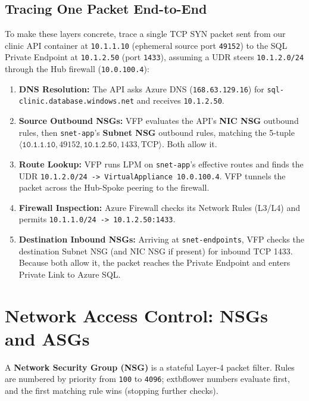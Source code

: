 \subsection{Tracing One Packet End-to-End}
To make these layers concrete, trace a single TCP SYN packet sent from our clinic API container at \texttt{10.1.1.10} (ephemeral source port \texttt{49152}) to the SQL Private Endpoint at \texttt{10.1.2.50} (port \texttt{1433}), assuming a UDR steers \texttt{10.1.2.0/24} through the Hub firewall (\texttt{10.0.100.4}):
\begin{enumerate}[leftmargin=15pt]
  \item \textbf{DNS Resolution:} The API asks Azure DNS (\texttt{168.63.129.16}) for \texttt{sql-clinic.database.windows.net} and receives \texttt{10.1.2.50}.
  \item \textbf{Source Outbound NSGs:} VFP evaluates the API's \textbf{NIC NSG} outbound rules, then \texttt{snet-app}'s \textbf{Subnet NSG} outbound rules, matching the 5-tuple $\langle \texttt{10.1.1.10}, 49152, \texttt{10.1.2.50}, 1433, \text{TCP} \rangle$. Both allow it.
  \item \textbf{Route Lookup:} VFP runs LPM on \texttt{snet-app}'s effective routes and finds the UDR \texttt{10.1.2.0/24 -> VirtualAppliance 10.0.100.4}. VFP tunnels the packet across the Hub-Spoke peering to the firewall.
  \item \textbf{Firewall Inspection:} Azure Firewall checks its Network Rules (L3/L4) and permits \texttt{10.1.1.0/24 -> 10.1.2.50:1433}.
  \item \textbf{Destination Inbound NSGs:} Arriving at \texttt{snet-endpoints}, VFP checks the destination Subnet NSG (and NIC NSG if present) for inbound TCP 1433. Because both allow it, the packet reaches the Private Endpoint and enters Private Link to Azure SQL.
\end{enumerate}

\section{Network Access Control: NSGs and ASGs}

A \textbf{Network Security Group (NSG)} is a stateful Layer-4 packet filter. Rules are numbered by priority from \texttt{100} to \texttt{4096}; 	extbf{lower numbers evaluate first}, and the first matching rule wins (stopping further checks).

